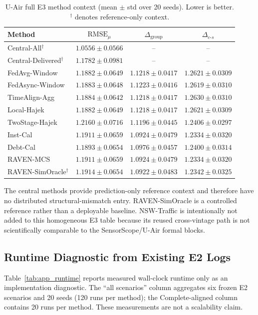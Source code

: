 \documentclass[letterpaper,journal]{IEEEtran}
\begin{document}
\begin{table}[t]
\centering
\caption{U-Air full E3 method context (mean $\pm$ std over 20 seeds).
Lower is better.  $^\dagger$ denotes reference-only context.}
\label{tab:app_e3_uair}
\scriptsize
\setlength{\tabcolsep}{4.3pt}
\begin{tabular}{lccc}
\toprule
Method & $\mathrm{RMSE}_{\mu}$ & $\Delta_{\mathrm{group}}$ & $\Delta_{c\text{-}s}$\\
\midrule
Central-All$^{\dagger}$ & $1.0556\pm0.0566$ & -- & -- \\
Central-Delivered$^{\dagger}$ & $1.1782\pm0.0981$ & -- & -- \\
FedAvg-Window & $1.1882\pm0.0649$ & $1.1218\pm0.0417$ & $1.2621\pm0.0309$ \\
FedAsync-Window & $1.1883\pm0.0648$ & $1.1223\pm0.0416$ & $1.2619\pm0.0310$ \\
TimeAlign-Agg & $1.1884\pm0.0642$ & $1.1218\pm0.0417$ & $1.2630\pm0.0310$ \\
Local-Hajek & $1.1882\pm0.0649$ & $1.1218\pm0.0417$ & $1.2621\pm0.0309$ \\
TwoStage-Hajek & $1.2160\pm0.0716$ & $1.1196\pm0.0445$ & $1.2406\pm0.0297$ \\
Inst-Cal & $1.1911\pm0.0659$ & $1.0924\pm0.0479$ & $1.2334\pm0.0320$ \\
Debt-Cal & $1.1893\pm0.0654$ & $1.0976\pm0.0457$ & $1.2400\pm0.0314$ \\
RAVEN-MCS & $1.1911\pm0.0659$ & $1.0924\pm0.0479$ & $1.2334\pm0.0320$ \\
RAVEN-SimOracle$^{\dagger}$ & $1.1914\pm0.0654$ & $1.0922\pm0.0483$ & $1.2342\pm0.0325$ \\
\bottomrule
\end{tabular}
\end{table}

The central methods provide prediction-only reference context and therefore
have no distributed structural-mismatch entry.  RAVEN-SimOracle is a controlled
reference rather than a deployable baseline.  NSW-Traffic is intentionally not
added to this homogeneous E3 table because its reused cross-vintage path is not
scientifically comparable to the SensorScope/U-Air formal blocks.

\subsection{Runtime Diagnostic from Existing E2 Logs}
\label{app:runtime}

Table~\ref{tab:app_runtime} reports measured wall-clock runtime only as an
implementation diagnostic.  The ``all scenarios'' column aggregates six frozen
E2 scenarios and 20 seeds (120 runs per method); the Complete-aligned column
contains 20 runs per method.  These measurements are not a scalability claim.
\end{document}
